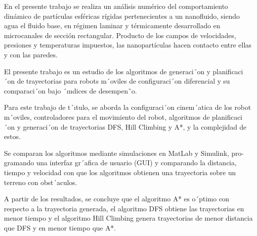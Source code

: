 \thispagestyle{fancy}
\vspace{5mm}
En el presente trabajo se realiza un análisis numérico del comportamiento dinámico de partículas esféricas rígidas pertenecientes a un nanofluido, siendo agua el fluido base, en régimen laminar y térmicamente desarrollado en microcanales de sección rectangular. Producto de los campos de velocidades, presiones y temperaturas impuestos, las nanopartículas hacen contacto entre ellas y con las paredes.

El presente trabajo es un estudio de los algoritmos de generaci´on y planificaci´on de  trayectorias  para  robots  m´oviles  de  configuraci´on  diferencial  y  su  comparaci´on bajo ´ındices de desempen˜o.

Para  este  trabajo  de  t´ıtulo,  se  aborda  la  configuraci´on  cinem´atica  de  los  robot m´oviles,  controladores  para  el  movimiento  del  robot,  algoritmos  de  planificaci´on  y generaci´on de trayectorias DFS, Hill Climbing y A*, y la complejidad de estos.

Se comparan los algoritmos mediante simulaciones en MatLab y Simulink, pro- gramando una interfaz gr´afica de usuario (GUI) y comparando la distancia, tiempo y velocidad con que los algoritmos obtienen una trayectoria sobre un terreno con obst´aculos.

A partir de los resultados, se concluye que el algoritmo A* es o´ptimo con respecto a la trayectoria generada, el algoritmo DFS obtiene las trayectorias en menor tiempo y el algoritmo Hill Climbing genera trayectorias de menor distancia que DFS y en menor tiempo que A*.

